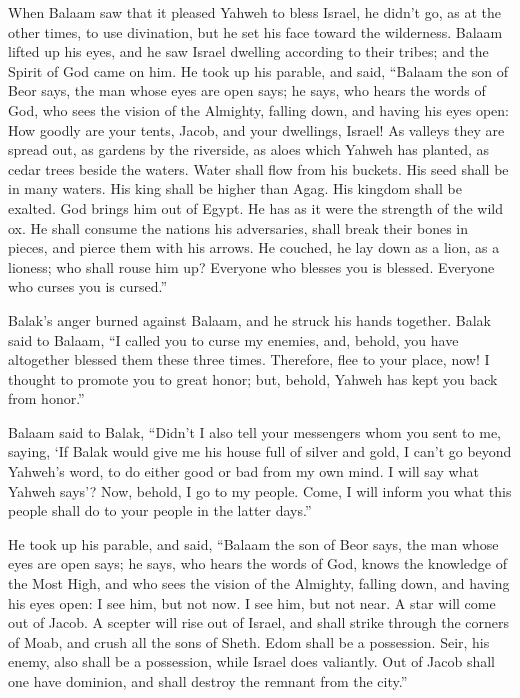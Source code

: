  When Balaam saw that it pleased Yahweh to bless Israel, he
didn't go, as at the other times, to use divination, but he set his face
toward the wilderness.  Balaam lifted up his eyes, and he
saw Israel dwelling according to their tribes; and the Spirit of God
came on him.  He took up his parable, and said, ``Balaam the
son of Beor says, the man whose eyes are open says;  he
says, who hears the words of God, who sees the vision of the Almighty,
falling down, and having his eyes open:  How goodly are your
tents, Jacob, and your dwellings, Israel!  As valleys they
are spread out, as gardens by the riverside, as aloes which Yahweh has
planted, as cedar trees beside the waters.  Water shall flow
from his buckets. His seed shall be in many waters. His king shall be
higher than Agag. His kingdom shall be exalted.  God brings
him out of Egypt. He has as it were the strength of the wild ox. He
shall consume the nations his adversaries, shall break their bones in
pieces, and pierce them with his arrows.  He couched, he lay
down as a lion, as a lioness; who shall rouse him up? Everyone who
blesses you is blessed. Everyone who curses you is cursed.''

 Balak's anger burned against Balaam, and he struck his
hands together. Balak said to Balaam, ``I called you to curse my
enemies, and, behold, you have altogether blessed them these three
times.  Therefore, flee to your place, now! I thought to
promote you to great honor; but, behold, Yahweh has kept you back from
honor.''

 Balaam said to Balak, ``Didn't I also tell your messengers
whom you sent to me, saying,  `If Balak would give me his
house full of silver and gold, I can't go beyond Yahweh's word, to do
either good or bad from my own mind. I will say what Yahweh says'?
 Now, behold, I go to my people. Come, I will inform you
what this people shall do to your people in the latter days.''

 He took up his parable, and said, ``Balaam the son of Beor
says, the man whose eyes are open says;  he says, who hears
the words of God, knows the knowledge of the Most High, and who sees the
vision of the Almighty, falling down, and having his eyes open:
 I see him, but not now. I see him, but not near. A star
will come out of Jacob. A scepter will rise out of Israel, and shall
strike through the corners of Moab, and crush all the sons of Sheth.
 Edom shall be a possession. Seir, his enemy, also shall be
a possession, while Israel does valiantly.  Out of Jacob
shall one have dominion, and shall destroy the remnant from the city.''

